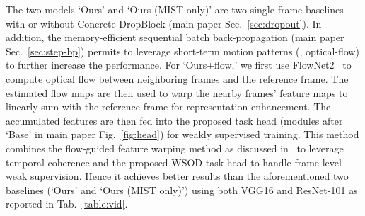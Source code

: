 \documentclass[10pt,twocolumn,letterpaper]{article}
\begin{document}
The two models `Ours' and `Ours (MIST only)' are two single-frame baselines with or without Concrete DropBlock (main paper Sec.~\ref{sec:dropout}). In addition, the memory-efficient sequential batch back-propagation (main paper Sec.~\ref{sec:step-bp}) permits to leverage  short-term motion patterns (\ie, optical-flow) to further increase the performance. For `Ours+flow,' we first use FlowNet2~\cite{flownet2} to compute optical flow between  neighboring frames and the reference frame. The estimated flow maps are then used to warp the nearby frames' feature maps to linearly sum with the reference frame for representation enhancement. The accumulated features are then fed into the proposed task head (modules after `Base' in main paper Fig.~\ref{fig:head}) for weakly supervised training. This method combines the flow-guided feature warping method as discussed in~\cite{zhu17fgfa} to leverage temporal coherence and the proposed WSOD task head to handle frame-level weak supervision. Hence it achieves better results than the aforementioned two baselines (`Ours' and `Ours (MIST only)') using both VGG16 and ResNet-101 as reported in Tab.~\ref{table:vid}. 
\end{document}
